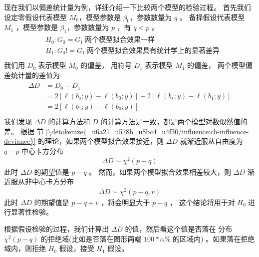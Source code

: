 \documentclass[letterpaper,10pt,english]{sphinxmanual}
\begin{document}
现在我们以偏差统计量为例，详细介绍一下比较两个模型的检验过程。
首先我们设定零假设代表模型 \(M_0\)，模型参数是 \(\beta_0\)，参数数量为 \(q\) 。
备择假设代表模型 \(M_1\) ，模型参数是 \(\beta_1\)，参数数量为 \(p\) ，有 \(q<p\) 。
\begin{align}\label{equation:模型评估/influence:模型评估/influence:40}\!\begin{aligned}
&H_0: G_0=G_1 \ \text{两个模型拟合效果一样}\\
&H_1: G_0 != G_1 \ \text{两个模型拟合效果具有统计学上的显著差异}\\
\end{aligned}\end{align}
我们用 \(D_0\) 表示模型 \(M_0\) 的偏差，
用符号 \(D_1\) 表示模型 \(M_1\) 的偏差，
两个模型偏差统计量的差值为
\begin{align}\label{equation:模型评估/influence:模型评估/influence:41}\!\begin{aligned}
\Delta D &= D_0 - D_1\\
&= 2[ \ell(b_s;y) - \ell(b_0;y) ] - 2[ \ell(b_s;y) - \ell(b_1;y) ]\\
&= 2[  \ell(b_1;y) - \ell(b_0;y)]\\
\end{aligned}\end{align}
我们发现 \(\Delta D\) 的计算方法和 \(D\) 的计算方法是一致，都是两个模型对数似然值的差。
根据 \hyperref[\detokenize{_u6a21_u578b_u8bc4_u4f30/influence:ch-influence-deviance}]{节 \ref{\detokenize{_u6a21_u578b_u8bc4_u4f30/influence:ch-influence-deviance}}} 的理论，如果两个模型拟合效果接近，则 \(\Delta D\)
就渐近服从自由度为 \(q-p\) 中心卡方分布
\begin{equation}\label{equation:模型评估/influence:模型评估/influence:42}
\begin{split}\Delta D \sim \chi^2(p-q)\end{split}
\end{equation}
此时 \(\Delta D\) 的期望值是 \(p-q\) 。
然而，如果两个模型拟合效果相差较大，则 \(\Delta D\) 渐近服从非中心卡方分布
\begin{equation}\label{equation:模型评估/influence:模型评估/influence:43}
\begin{split}\Delta D \sim \chi^2(p-q,v)\end{split}
\end{equation}
此时 \(\Delta D\) 的期望值是 \(p-q+v\) ，将会明显大于 \(p-q\) ，
这个结论将用于对 \(H_0\) 进行显著性检验。

根据假设检验的过程，我们计算出 \(\Delta D\) 的值，然后看这个值是否落在
分布 \(\chi^2(p-q)\) 的拒绝域(比如是否落在图形两端 \(100*\alpha \%\) 的区域内)
。如果落在拒绝域内，则拒绝 \(H_0\) 假设，接受 \(H_1\) 假设。
\end{document}
